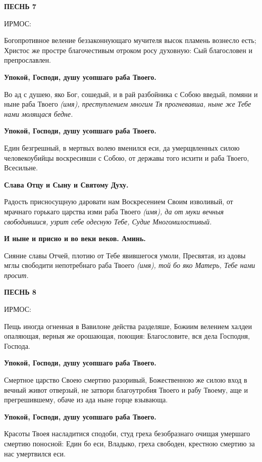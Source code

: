 \bfseries ПЕСНЬ 7


ИРМОС:\normalfont{}


Богопротивное веление беззаконнующаго мучителя высок пламень вознесло есть; Христос же простре благочестивым отроком росу духовную: Сый благословен и препрославлен.


\bfseries Упокой, Господи, душу усопшаго раба Твоего.\normalfont{}\normalfont{}


Во ад с душею, яко Бог, сошедый, и в рай разбойника с Собою введый, помяни и ныне раба Твоего \itshape (имя)\normalfont{}, преступлением многим Тя прогневавша, ныне же Тебе нами молящася бедне.


\bfseries Упокой, Господи, душу усопшаго раба Твоего.\normalfont{}\normalfont{}


Един безгрешный, в мертвых волею вменился еси, да умерщвленных силою человекоубийцы воскресивши с Собою, от державы того исхити и раба Твоего, Всесильне.


\bfseries Слава Отцу и Сыну и Святому Духу.\normalfont{}\normalfont{}


Радость присносущную даровати нам Воскресением Своим изволивый, от мрачнаго горькаго царства изми раба Твоего \itshape (имя)\normalfont{}, да от муки вечныя свободившися, узрит себе одесную Тебе, Судие Многомилостивый.


\bfseries И ныне и присно и во веки веков. Аминь.\normalfont{}\normalfont{}


Сияние славы Отчей, плотию от Тебе явившегося умоли, Пресвятая, из адовы мглы свободити непотребнаго раба Твоего \itshape (имя)\normalfont{}, той бо яко Матерь, Тебе нами просит. 


\bfseries ПЕСНЬ 8


ИРМОС:\normalfont{}


Пещь иногда огненная в Вавилоне действа разделяше, Божиим велением халдеи опаляющая, верныя же орошающая, поющия: Благословите, вся дела Господня, Господа.


\bfseries Упокой, Господи, душу усопшаго раба Твоего.\normalfont{}\normalfont{}


Смертное царство Своею смертию разоривый, Божественною же силою вход в вечный живот отверзый, не затвори благоутробия Твоего и рабу Твоему, аще и прегрешившему, обаче из ада ныне горце взывающа.


\bfseries Упокой, Господи, душу усопшаго раба Твоего.\normalfont{}\normalfont{}


Красоты Твоея насладитися сподоби, студ греха безобразнаго очищая умершаго смертию поносной: Един бо еси, Владыко, греха свободен, крестною смертию за нас умертвился еси.


